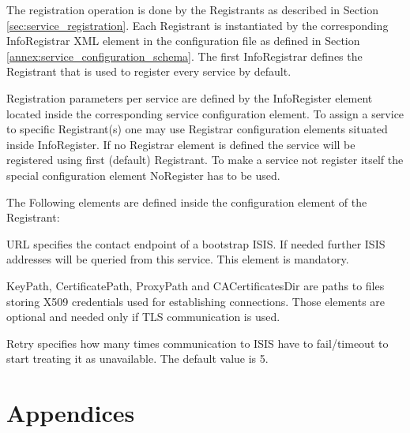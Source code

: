 \documentclass{book}
\begin{document}
The registration operation is done by the Registrants as described in Section \ref{sec:service_registration}.
Each Registrant is instantiated by the corresponding InfoRegistrar XML element in the configuration file as 
defined in Section \ref{annex:service_configuration_schema}. The first InfoRegistrar defines the Registrant 
that is used to register every service by default.

Registration parameters per service are defined by the InfoRegister element located inside the corresponding 
service configuration element. To assign a service to specific Registrant(s) one may use Registrar 
configuration elements situated inside InfoRegister. If no Registrar element is defined the service will 
be registered using first (default) Registrant. To make a service not register itself the special configuration element 
NoRegister has to be used.

The Following elements are defined inside the configuration element of the Registrant:
\begin{description}
\item{URL} specifies the contact endpoint of a bootstrap ISIS. If needed further ISIS addresses will be 
queried from this service. This element is mandatory.
\item{KeyPath, CertificatePath, ProxyPath and CACertificatesDir} are paths to files storing X509 
credentials used for establishing connections. Those elements are optional and needed only if 
TLS communication is used.
\item{Retry} specifies how many times communication to ISIS have to fail/timeout to start treating it
as unavailable. The default value is 5.
\end{description}




\chapter{Appendices}
\end{document}
